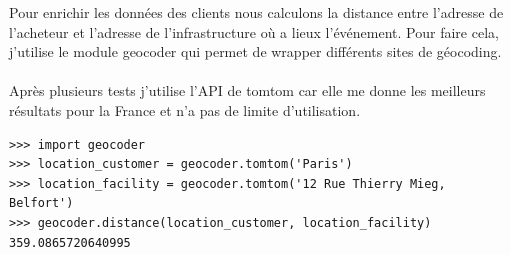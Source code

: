 Pour enrichir les données des clients nous calculons la distance entre l'adresse de l'acheteur et l'adresse de l'infrastructure où a lieux l'événement.
Pour faire cela, j'utilise le module geocoder qui permet de wrapper différents sites de géocoding.
\\ \\
Après plusieurs tests j'utilise l'API de tomtom car elle me donne les meilleurs résultats pour la France et n'a pas de limite d'utilisation.

\lstset{style=custompython}
\begin{lstlisting}
>>> import geocoder
>>> location_customer = geocoder.tomtom('Paris')
>>> location_facility = geocoder.tomtom('12 Rue Thierry Mieg, Belfort')
>>> geocoder.distance(location_customer, location_facility)
359.0865720640995
\end{lstlisting}
\leavevmode \\



